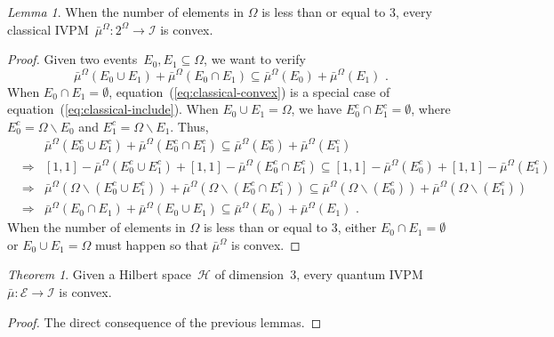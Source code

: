 \documentclass{article}
\theoremstyle{remark}
\newtheorem{thm}{Theorem}
\newtheorem{lemma}{Lemma}
\newcommand{\Hilb}{\mathcal{H}}
\newcommand{\events}{\ensuremath{\mathcal{E}}}
\begin{document}
\begin{lemma}When the number of elements in $\Omega$ is less than
or equal to 3, every classical IVPM~$\bar{\mu}^{\Omega}:2^{\Omega}\rightarrow\mathscr{I}$
is convex.\end{lemma}
\begin{proof}
Given two events~$E_{0},E_{1}\subseteq\Omega$, we want to verify
\begin{equation}
\bar{\mu}^{\Omega}\left(E_{0}\cup E_{1}\right)+\bar{\mu}^{\Omega}\left(E_{0}\cap E_{1}\right)\subseteq\bar{\mu}^{\Omega}\left(E_{0}\right)+\bar{\mu}^{\Omega}\left(E_{1}\right)\textrm{ .}\label{eq:classical-convex}
\end{equation}
When $E_{0}\cap E_{1}=\emptyset$, equation~(\ref{eq:classical-convex})
is a special case of equation~(\ref{eq:classical-include}). When
$E_{0}\cup E_{1}=\Omega$, we have $E_{0}^{c}\cap E_{1}^{c}=\emptyset$,
where $E_{0}^{c}=\Omega\backslash E_{0}$ and $E_{1}^{c}=\Omega\backslash E_{1}$.
Thus, 
\begin{eqnarray*}
 &  & \bar{\mu}^{\Omega}\left(E_{0}^{c}\cup E_{1}^{c}\right)+\bar{\mu}^{\Omega}\left(E_{0}^{c}\cap E_{1}^{c}\right)\subseteq\bar{\mu}^{\Omega}\left(E_{0}^{c}\right)+\bar{\mu}^{\Omega}\left(E_{1}^{c}\right)\\
 & \Rightarrow & \left[1,1\right]-\bar{\mu}^{\Omega}\left(E_{0}^{c}\cup E_{1}^{c}\right)+\left[1,1\right]-\bar{\mu}^{\Omega}\left(E_{0}^{c}\cap E_{1}^{c}\right)\subseteq\left[1,1\right]-\bar{\mu}^{\Omega}\left(E_{0}^{c}\right)+\left[1,1\right]-\bar{\mu}^{\Omega}\left(E_{1}^{c}\right)\\
 & \Rightarrow & \bar{\mu}^{\Omega}\left(\Omega\backslash\left(E_{0}^{c}\cup E_{1}^{c}\right)\right)+\bar{\mu}^{\Omega}\left(\Omega\backslash\left(E_{0}^{c}\cap E_{1}^{c}\right)\right)\subseteq\bar{\mu}^{\Omega}\left(\Omega\backslash\left(E_{0}^{c}\right)\right)+\bar{\mu}^{\Omega}\left(\Omega\backslash\left(E_{1}^{c}\right)\right)\\
 & \Rightarrow & \bar{\mu}^{\Omega}\left(E_{0}\cap E_{1}\right)+\bar{\mu}^{\Omega}\left(E_{0}\cup E_{1}\right)\subseteq\bar{\mu}^{\Omega}\left(E_{0}\right)+\bar{\mu}^{\Omega}\left(E_{1}\right)\textrm{ .}
\end{eqnarray*}
When the number of elements in $\Omega$ is less than or equal to
3, either $E_{0}\cap E_{1}=\emptyset$ or $E_{0}\cup E_{1}=\Omega$
must happen so that $\bar{\mu}^{\Omega}$ is convex.
\end{proof}
\begin{thm}Given a Hilbert space~$\Hilb$ of dimension~$3$, every
quantum IVPM~$\bar{\mu}:\events\rightarrow\mathscr{I}$ is convex.\end{thm}
\begin{proof}
The direct consequence of the previous lemmas.
\end{proof}
\end{document}
